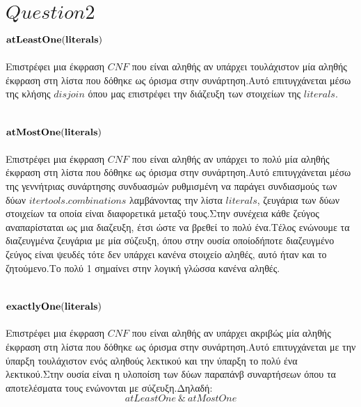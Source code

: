 \documentclass[10pt]{article}
\begin{document}
\section*{$Question 2$}
\vspace{5mm}
\underline{\underline{$\bf atLeastOne(literals)$}} \\ \\
Επιστρέφει μια έκφραση $CNF$ που είναι αληθής αν υπάρχει τουλάχιστον μία αληθής έκφραση στη λίστα που δόθηκε ως όρισμα στην συνάρτηση.Αυτό επιτυγχάνεται μέσω της κλήσης $disjoin$ όπου μας επιστρέφει την διάζευξη των στοιχείων της $literals$. \\ \\ \\
\underline{\underline{$\bf atMostOne(literals)$}} \\ \\
Επιστρέφει μια έκφραση $CNF$ που είναι αληθής αν υπάρχει το πολύ μία αληθής έκφραση στη λίστα που δόθηκε ως όρισμα στην συνάρτηση.Αυτό επιτυγχάνεται μέσω της γεννήτριας συνάρτησης συνδυασμών ρυθμισμένη να παράγει συνδιασμούς των δύων $itertools.combinations$ λαμβάνοντας την λίστα $literals$, ζευγάρια των δύων στοιχείων τα οποία είναι διαφορετικά μεταξύ τους.Στην συνέχεια κάθε ζεύγος αναπαρίσταται ως μια διαζευξη, έτσι ώστε να βρεθεί το πολύ ένα.Τέλος ενώνουμε τα διαζευγμένα ζευγάρια με μία σύζευξη, όπου στην ουσία οποίοδήποτε διαζευγμένο ζεύγος είναι ψευδές τότε δεν υπάρχει κανένα στοιχείο αληθές, αυτό ήταν και το ζητούμενο.Το πολύ 1 σημαίνει στην λογική γλώσσα κανένα αληθές. \\ \\ \\
\underline{\underline{$\bf exactlyOne(literals)$}} \\ \\
Επιστρέφει μια έκφραση $CNF$ που είναι αληθής αν υπάρχει ακριβώς μία αληθής έκφραση στη λίστα που δόθηκε ως όρισμα στην συνάρτηση.Αυτό επιτυγχάνεται με την ύπαρξη τουλάχιστον ενός αληθούς λεκτικού και την ύπαρξη το πολύ ένα λεκτικού.Στην ουσία είναι η υλοποίση των δύων παραπάνβ συναρτήσεων όπου τα αποτελέσματα τους ενώνονται με σύζευξη.Δηλαδή: \\
\[atLeastOne \  \&  \ atMostOne \]
\\ \\ \\
\end{document}
